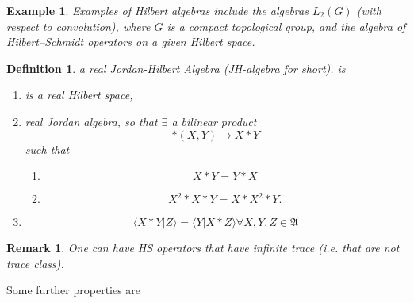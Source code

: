 \documentclass[aps, preprint]{revtex4}
\newtheorem{definition}[theorem]{Definition}
\newtheorem{example}[theorem]{Example}
\newtheorem{remark}[theorem]{Remark}
\begin{document}
\begin{example}
Examples of Hilbert algebras include the algebras $L_{2} (G)$ (with respect to convolution), where $G$ is a compact topological group, and the algebra of Hilbert--Schmidt operators on a given Hilbert space. 
\end{example}


\begin{definition}
a real J\emph{ordan-Hilbert Algebra} (JH-algebra for short). is 


\begin{enumerate}
\item is a real Hilbert space, 

\item real Jordan algebra, so
that $ \exists $ a bilinear product
\begin{equation} \ast \left (X ,Y\right ) \rightarrow X \ast Y
\end{equation}such that 


\begin{enumerate}
\item
\begin{equation}X \ast Y =Y \ast X
\end{equation}

\item
\begin{equation}X^{2} \ast X \ast Y =X \ast X^{2} \ast Y\text{.}
\end{equation}\end{enumerate}


\item
\begin{equation} \langle \left .X \ast Y\right \vert Z \rangle  = \langle \left .Y\right \vert X \ast Z \rangle  \forall X ,Y ,Z \in \mathfrak{A}
\end{equation}\end{enumerate}
\end{definition}


\begin{remark}
One can have HS operators that have infinite trace (i.e. that are not trace class). 
\end{remark}

Some further properties
are 
\end{document}
